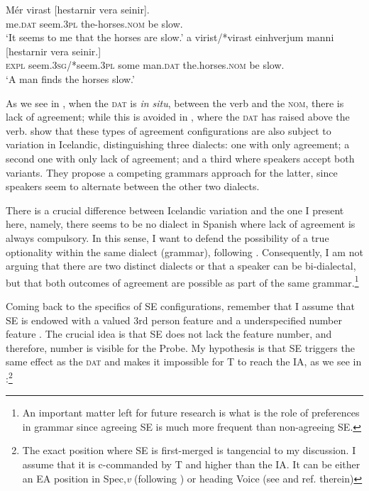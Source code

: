 \documentclass[output=paper,colorlinks,citecolor=brown]{langscibook}
\begin{document}
\ea \label{ex:05:Icelraising}
        \citet[998]{Holmberg&Hroasdottir2003}
	\ea  \label{ex:05:Icelraisinga}
		\gll Mér vir{\dh}ast [hestarnir vera seinir].  \\
		me.\textsc{dat} seem.\textsc{3pl} the-horses.\textsc{nom} be slow. \\
		\glt`It seems to me that the horses are slow.’
	\ex \label{ex:05:Icelraisingb}
		\gll  {\TH}a{\dh} vir{\dh}ist/*vir{\dh}ast einhverjum manni [hestarnir vera seinir.] \\
		\textsc{expl} seem.\textsc{3sg}/*seem.\textsc{3pl} some man.\textsc{dat} the.horses.\textsc{nom} be slow.\\
			\glt `A man finds the horses slow.'
\z \z

As we see in , when the \textsc{dat} is \textit{in situ}, between the verb and the \textsc{nom}, there is lack of agreement; while this is avoided in , where the \textsc{dat} has raised above the verb. \citet{Sirg_Holm2008} show that these types of agreement configurations are also subject to variation in Icelandic, distinguishing three dialects: one with only agreement; a second one with only lack of agreement; and a third where speakers accept both variants. They propose a competing grammars approach for the latter, since speakers seem to alternate between the other two dialects.

There is a crucial difference between Icelandic variation and the one I present here, namely, there seems to be no dialect in Spanish where lack of agreement is always compulsory. In this sense, I want to defend the possibility of a true optionality within the same dialect (grammar), following \citet{Biberauer_Richards2006}. Consequently, I am not arguing that there are two distinct dialects or that a speaker can be bi-dialectal, but that both outcomes of agreement are possible as part of the same grammar.\footnote{An important matter left for future research is what is the role of preferences in grammar since agreeing SE is much more frequent than non-agreeing SE.}

Coming back to the specifics of SE configurations, remember that I assume that SE is endowed with a valued 3rd person feature and a underspecified number feature \citep{DAlessandro2007}. The crucial idea is that SE does not lack the feature number, and therefore, number is visible for the Probe. My hypothesis is that SE triggers the same effect as the \textsc{dat} and makes it impossible for T to reach the IA, as we see in :\footnote{The exact position where SE is first-merged is tangencial to my discussion. I assume that it is c-commanded by T and higher than the IA. It can be either an EA position in Spec,\textit{v} (following \citealt{RaposoUriag1996, DAlessandro2007, Torrego2008}) or heading Voice (see \citealt{MacDonald2017} and ref. therein)}
\end{document}
